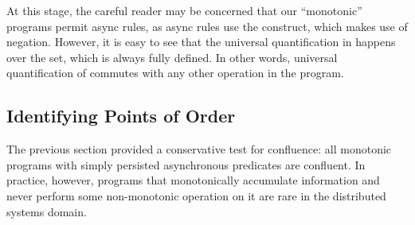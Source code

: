At this stage, the careful reader may be concerned that our ``monotonic''
programs permit async rules, as async rules use the  construct,
which makes use of negation.  However, it is easy to see that the universal
quantification in  happens over the  set, which
is always fully defined.  In other words, universal quantification of
 commutes with any other operation in the program.


\subsection{Identifying Points of Order}
The previous section provided a conservative test for confluence: all monotonic
programs with simply persisted asynchronous predicates are confluent.  In
practice, however, programs that monotonically accumulate information and never
perform some non-monotonic operation on it are rare in the distributed systems
domain.


